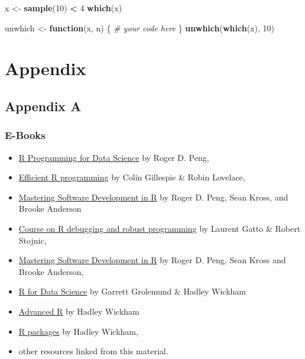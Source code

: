 \documentclass[]{book}
\newenvironment{Shaded}{\begin{snugshade}}{\end{snugshade}}
\newcommand{\CommentTok}[1]{\textcolor[rgb]{0.56,0.35,0.01}{\textit{#1}}}
\newcommand{\ControlFlowTok}[1]{\textcolor[rgb]{0.13,0.29,0.53}{\textbf{#1}}}
\newcommand{\DecValTok}[1]{\textcolor[rgb]{0.00,0.00,0.81}{#1}}
\newcommand{\KeywordTok}[1]{\textcolor[rgb]{0.13,0.29,0.53}{\textbf{#1}}}
\newcommand{\NormalTok}[1]{#1}
\newcommand{\OperatorTok}[1]{\textcolor[rgb]{0.81,0.36,0.00}{\textbf{#1}}}
\newcommand{\StringTok}[1]{\textcolor[rgb]{0.31,0.60,0.02}{#1}}
\providecommand{\tightlist}{%
  \setlength{\itemsep}{0pt}\setlength{\parskip}{0pt}}
\theoremstyle{definition}
\theoremstyle{definition}
\theoremstyle{definition}
\theoremstyle{remark}
\begin{document}
\begin{Shaded}
\begin{Highlighting}[]
\NormalTok{x <-}\StringTok{ }\KeywordTok{sample}\NormalTok{(}\DecValTok{10}\NormalTok{) }\OperatorTok{<}\StringTok{ }\DecValTok{4}
\KeywordTok{which}\NormalTok{(x)}

\NormalTok{unwhich <-}\StringTok{ }\ControlFlowTok{function}\NormalTok{(x, n) \{}
  \CommentTok{# your code here}
\NormalTok{\}}
\KeywordTok{unwhich}\NormalTok{(}\KeywordTok{which}\NormalTok{(x), }\DecValTok{10}\NormalTok{)}
\end{Highlighting}
\end{Shaded}

\hypertarget{part-appendix}{%
\part{Appendix}\label{part-appendix}}

\hypertarget{appendix-resources}{%
\chapter{Appendix A}\label{appendix-resources}}

\hypertarget{e-books}{%
\section{E-Books}\label{e-books}}

\begin{itemize}
\tightlist
\item
  \href{https://bookdown.org/rdpeng/rprogdatascience/}{R Programming for
  Data Science} by Roger D. Peng,
\item
  \href{https://bookdown.org/csgillespie/efficientR/}{Efficient R
  programming} by Colin Gillespie \& Robin Lovelace,
\item
  \href{https://bookdown.org/rdpeng/RProgDA/}{Mastering Software
  Development in R} by Roger D. Peng, Sean Kross, and Brooke Anderson
\item
  \href{https://github.com/lgatto/2016-02-25-adv-programming-EMBL}{Course
  on R debugging and robust programming} by Laurent Gatto \& Robert
  Stojnic,
\item
  \href{https://bookdown.org/rdpeng/RProgDA/}{Mastering Software
  Development in R} by Roger D. Peng, Sean Kross and Brooke Anderson,
\item
  \href{http://r4ds.had.co.nz/index.html}{R for Data Science} by Garrett
  Grolemund \& Hadley Wickham
\item
  \href{http://adv-r.had.co.nz/}{Advanced R} by Hadley Wickham
\item
  \href{http://r-pkgs.had.co.nz/}{R packages} by Hadley Wickham,
\item
  other resources linked from this material.
\end{itemize}


\end{document}

